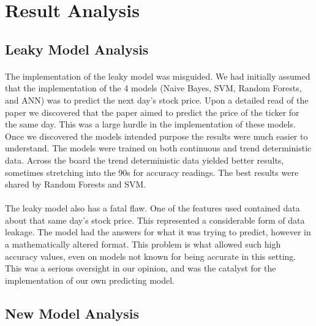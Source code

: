 \documentclass[11pt]{article}
\begin{document}
	
	\section{Result Analysis}
	
		\subsection{Leaky Model Analysis}
		
			\paragraph{} The implementation of the leaky model was misguided. We had initially assumed that the implementation of the 4 models (Naive Bayes, SVM, Random Forests, and ANN) was to predict the next day's stock price. Upon a detailed read of the paper we discovered that the paper aimed to predict the price of the ticker for the same day. This was a large hurdle in the implementation of these models. Once we discovered the models intended purpose the results were much easier to understand. The models were trained on both continuous and trend deterministic data. Across the board the trend deterministic data yielded better results, sometimes stretching into the 90s for accuracy readings. The best results were shared by Random Forests and SVM. 
			
			\paragraph{} The leaky model also has a fatal flaw. One of the features used contained data about that same day's stock price. This represented a considerable form of data leakage. The model had the answers for what it was trying to predict, however in a mathematically altered format. This problem is what allowed such high accuracy values, even on models not known for being accurate in this setting. This was a serious oversight in our opinion, and was the catalyst for the implementation of our own predicting model.
			
		\subsection{New Model Analysis}
	
\end{document}
